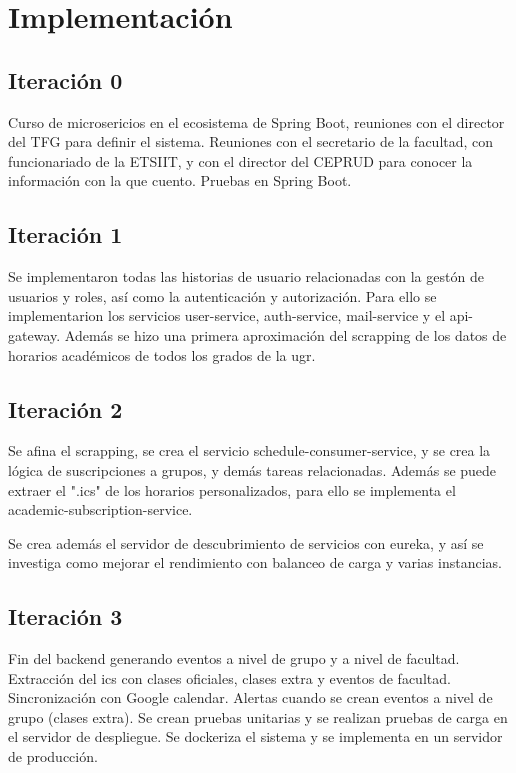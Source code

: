 \chapter{Implementación}\label{cap:implementacion}

\section{Iteración 0}

Curso de microsericios en el ecosistema de Spring Boot, reuniones con el director del TFG para definir el sistema.
Reuniones con el secretario de la facultad, con funcionariado de la ETSIIT, y con el director del CEPRUD para conocer  la información con la que cuento.
Pruebas en Spring Boot.

\section{Iteración 1}

Se implementaron todas las historias de usuario relacionadas con la gestón de usuarios y roles, así como la autenticación y autorización. Para ello
se implementarion los servicios user-service, auth-service, mail-service y el api-gateway.
Además se hizo una primera aproximación del scrapping de los datos de horarios académicos de todos los grados de la ugr.

\section{Iteración 2}

Se afina el scrapping, se crea el servicio schedule-consumer-service, y se crea la lógica de suscripciones a grupos, y demás tareas relacionadas. Además se puede extraer el ".ics"
de los horarios personalizados, para ello se implementa el academic-subscription-service.

Se crea además el servidor de descubrimiento de servicios con eureka, y así se investiga como mejorar el rendimiento con balanceo de carga y varias instancias.

\section{Iteración 3}

Fin del backend generando eventos a nivel de grupo y a nivel de facultad. Extracción del ics con clases oficiales, clases extra y eventos de facultad. Sincronización con Google calendar.
Alertas cuando se crean eventos a nivel de grupo (clases extra).
Se crean pruebas unitarias y se realizan pruebas de carga en el servidor de despliegue.
Se dockeriza el sistema y se implementa en un servidor de producción.

